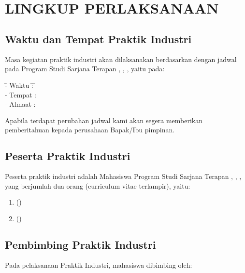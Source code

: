 \chapter[LINGKUP PERLAKSANAAN]{\\ LINGKUP PERLAKSANAAN}

\section{Waktu dan Tempat Praktik Industri}

Masa kegiatan praktik industri akan dilaksanakan berdasarkan dengan jadwal pada Program Studi Sarjana Terapan {\prodi}, {\departemen}, {\fakultas}, {\universitas} yaitu pada:

\begin{tabbing}
    \hspace{2em} \= {- Waktu} \hspace{1em} \= : \hspace{1em} \= {\waktuPelaksanaan} \\
    \> {- Tempat} \> : \> {\perusahaan} \\ 
    \> {- Almaat} \> : \> {\alamatPerusahaan} \\
\end{tabbing}

Apabila terdapat perubahan jadwal kami akan segera memberikan pemberitahuan kepada perusahaan Bapak/Ibu pimpinan.

\section{Peserta Praktik Industri}

Peserta praktik industri adalah Mahasiswa Program Studi Sarjana Terapan {\prodi}, {\departemen}, {\fakultas}, {\universitas} yang berjumlah dua orang (curriculum vitae terlampir), yaitu:

\begin{enumerate}
    \item {\penulisPertama} ({\nimPertama})
    \item {\penulisKedua} ({\nimKedua})
\end{enumerate}

\section{Pembimbing Praktik Industri}

Pada pelaksanaan Praktik Industri, mahasiswa dibimbing oleh:

